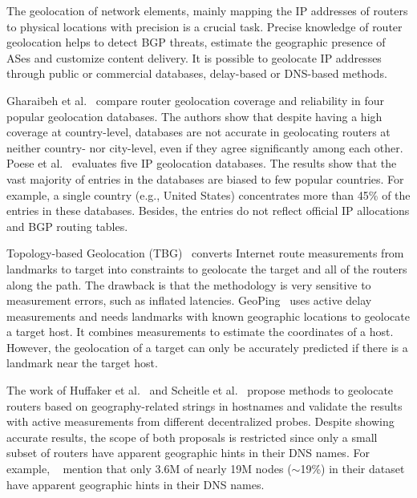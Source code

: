 	The geolocation of network elements, mainly mapping the IP addresses of routers to physical locations with precision is a crucial task. Precise knowledge of router geolocation helps to detect BGP threats, estimate the geographic presence of ASes and customize content delivery. It is possible to geolocate IP addresses through public or commercial databases, delay-based or DNS-based methods.

	Gharaibeh et al.~\cite{Gharaibeh:2017:LRG:3131365.3131380} compare router geolocation coverage and reliability in four popular geolocation databases. The authors show that despite having a  high coverage at country-level, databases are not accurate in geolocating routers at neither country- nor city-level, even if they agree significantly among each other. Poese et al.~\cite{Poese:2011:IGD:1971162.1971171} evaluates five IP geolocation databases. The results show that the vast majority of entries in the databases are biased to few popular countries. For example, a single country (e.g., United States) concentrates more than 45\% of the entries in these databases. Besides, the entries do not reflect official IP allocations and BGP routing tables.

	Topology-based Geolocation (TBG)~\cite{Katz-Bassett:2006:TIG:1177080.1177090} converts Internet route measurements from landmarks to target into constraints to geolocate the target and all of the routers along the path. The drawback is that the methodology is very sensitive to measurement errors, such as inflated latencies. GeoPing~\cite{Padmanabhan:2001:IGM:383059.383073} uses active delay measurements and needs landmarks with known geographic locations to geolocate a target host. It combines measurements to estimate the coordinates of a host. However, the geolocation of a target can only be accurately predicted if there is a landmark near the target host.

	The work of Huffaker et al.~\cite{Huffaker:2014:DDR:2656877.2656879} and Scheitle et al.~\cite{8002903} propose methods to geolocate routers based on geography-related strings in hostnames and validate the results with active measurements from different decentralized probes. Despite showing accurate results, the scope of both proposals is restricted since only a small subset of routers have apparent geographic hints in their DNS names. For example, ~\cite{Huffaker:2014:DDR:2656877.2656879} mention that only 3.6M of nearly 19M nodes ($\sim$19\%) in their dataset have apparent geographic hints in their DNS names. 

